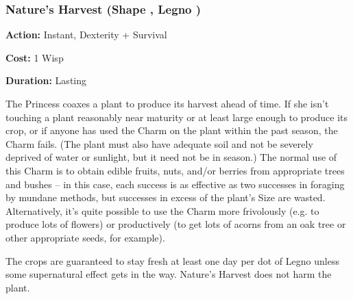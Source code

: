 \subsubsection*{Nature's Harvest (Shape \textbullet, Legno \textbullet)}

\noindent \textbf{Action:} Instant, Dexterity + Survival 

\noindent \textbf{Cost:} 1 Wisp

\noindent \textbf{Duration:} Lasting 

The Princess coaxes a plant to produce its harvest ahead of time. If she isn't touching a plant reasonably near maturity or at least large enough to produce its crop, or if anyone has used the Charm on the plant within the past season, the Charm fails. (The plant must also have adequate soil and not be severely deprived of water or sunlight, but it need not be in season.) The normal use of this Charm is to obtain edible fruits, nuts, and/or berries from appropriate trees and bushes -- in this case, each success is as effective as two successes in foraging by mundane methods, but successes in excess of the plant's Size are wasted. Alternatively, it's quite possible to use the Charm more frivolously (e.g. to produce lots of flowers) or productively (to get lots of acorns from an oak tree or other appropriate seeds, for example).

The crops are guaranteed to stay fresh at least one day per dot of Legno unless some supernatural effect gets in the way. Nature's Harvest does not harm the plant. 

